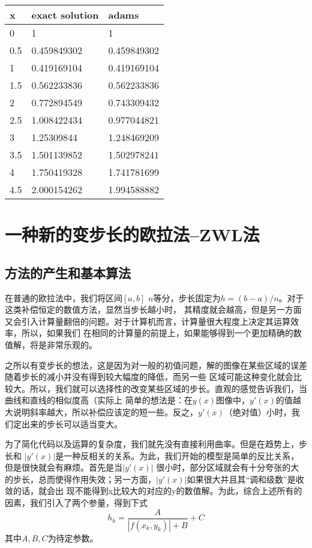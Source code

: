 \documentclass[a4paper,12pt]{article}
\begin{document}
\begin{center}
    \begin{tabular}{|l|l|l|}
       \hline
x&exact solution&adams\\
\hline
0&1&1\\
0.5&0.459849302&0.459849302\\
1&0.419169104&0.419169104\\
1.5&0.562233836&0.562233836\\
2&0.772894549&0.743309432\\
2.5&1.008422434&0.977044821\\
3&1.25309844&1.248469209\\
3.5&1.501139852&1.502978241\\
4&1.750419328&1.741781699\\
4.5&2.000154262&1.994588882\\
       \hline
     \end{tabular}
\end{center}




\section{一种新的变步长的欧拉法--ZWL法}
\subsection{方法的产生和基本算法}
在普通的欧拉法中，我们将区间$[a,b]$ $n$等分，步长固定为$h=(b-a)/n$。对于这类补偿恒定的数值方法，显然当步长越小时，
其精度就会越高，但是另一方面又会引入计算量翻倍的问题。对于计算机而言，计算量很大程度上决定其运算效率，所以，如果我们
在相同的计算量的前提上，如果能够得到一个更加精确的数值解，将是非常乐观的。\par
之所以有变步长的想法，这是因为对一般的初值问题，解的图像在某些区域的误差随着步长的减小并没有得到较大幅度的降低，而另一些
区域可能这种变化就会比较大。所以，我们就可以选择性的改变某些区域的步长。直观的感觉告诉我们，当曲线和直线的相似度高（实际上
简单的想法是：在$y(x)$图像中，$y'(x)$的值越大说明斜率越大，所以补偿应该定的短一些。反之，$y'(x)$（绝对值）小时，我们定出来的步长可以适当变大。\par
为了简化代码以及运算的复杂度，我们就先没有直接利用曲率。但是在趋势上，步长和
$|y'(x)|$是一种反相关的关系。为此，我们开始的模型是简单的反比关系，但是很快就会有麻烦。首先是当$|y'(x)|$
很小时，部分区域就会有十分夸张的大的步长，总而使得作用失效；另一方面，$|y'(x)|$如果很大并且其“调和级数”是收敛的话，就会出
现不能得到x比较大的对应的y的数值解。为此，综合上述所有的因素，我们引入了两个参量，得到下式
\begin{equation}
h_k=\frac{A}{\left|f(x_k,y_k)\right|+B}+C
\end{equation}
其中$A,B,C$为待定参数。
\end{document}
